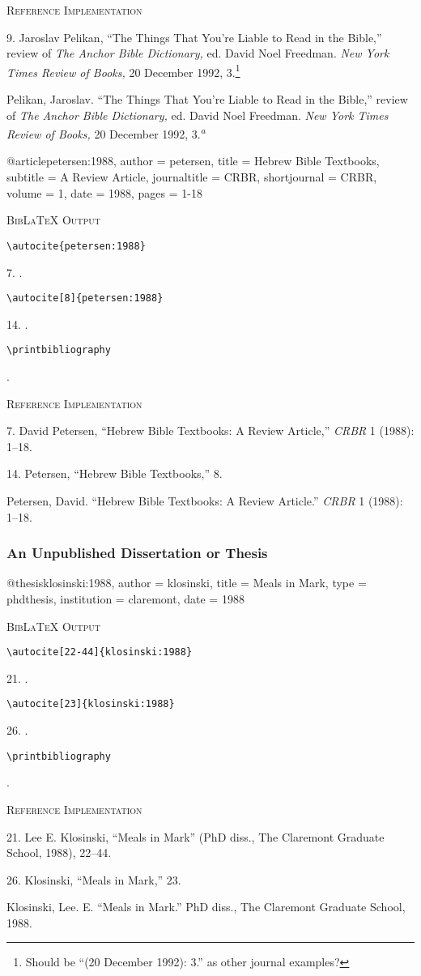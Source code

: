 \documentclass[a4paper]{article}
\newcommand\citetest[5]{%
  {\textsc{BibLaTeX Output}\par
   \nobreak
   \texttt{\textbackslash autocite[#2]\{#5\}}\par
   \color{biblatex-colour}
   #1. \cite[#2]{#5}.\par
   \color{black}
   \texttt{\textbackslash autocite[#4]\{#5\}}\par
   \color{biblatex-colour}
   #3. \cite[#4]{#5}.\par
   \color{black}
   \texttt{\textbackslash printbibliography}\par
   \color{biblatex-colour}
   \hangindent\bibindent\bibentrycite{#5}.\par}}
\newcommand\citetestnpf[4]{%
  {\textsc{BibLaTeX Output}\par
   \nobreak
   \texttt{\textbackslash autocite\{#4\}}\par
   \color{biblatex-colour}
   #1. \cite{#4}.\par
   \color{black}
   \texttt{\textbackslash autocite[#3]\{#4\}}\par
   \color{biblatex-colour}
   #2. \cite[#3]{#4}.\par
   \color{black}
   \texttt{\textbackslash printbibliography}\par
   \color{biblatex-colour}
   \hangindent\bibindent\bibentrycite{#4}.\par}}
\newenvironment{refimp}{%
  \begin{minipage}{\linewidth}
    \setlength{\parskip}{1ex}
    \textsc{Reference Implementation}\par
    \nobreak
    \color{reference-colour}
}{\end{minipage}}
\newenvironment{vb}{%
  \setlength{\parskip}{0pt}
  \verbatim}{\endverbatim}
\begin{document}
\begin{refimp}
  9. Jaroslav Pelikan, “The Things That You're Liable to Read in the Bible,”
  review of \emph{The Anchor Bible Dictionary,} ed. David Noel Freedman.
  \emph{New York Times Review of Books,} 20 December 1992, 3.\footnote{Should
  be “(20 December 1992): 3.” as other journal examples?}
  
  \hangindent\bibindent Pelikan, Jaroslav. “The Things That You're Liable to
  Read in the Bible,” review of \emph{The Anchor Bible Dictionary,} ed. David
  Noel Freedman. \emph{New York Times Review of Books,} 20 December 1992,
  3.\textsuperscript{\emph{a}}
\end{refimp}

\begin{vb}
@article{petersen:1988,
  author = petersen,
  title = {Hebrew Bible Textbooks},
  subtitle = {A Review Article},
  journaltitle = CRBR,
  shortjournal = {CRBR},
  volume = {1},
  date = {1988},
  pages = {1-18}
}
\end{vb}

\citetestnpf{7}{14}{8}{petersen:1988}

\begin{refimp}
  7. David Petersen, “Hebrew Bible Textbooks: A Review Article,” \emph{CRBR} 1
  (1988): 1–18.

  14. Petersen, “Hebrew Bible Textbooks,” 8.

  \hangindent\bibindent Petersen, David. “Hebrew Bible Textbooks: A Review
  Article.” \emph{CRBR} 1 (1988): 1–18.
\end{refimp}

\subsubsection{An Unpublished Dissertation or Thesis}

\begin{vb}
@thesis{klosinski:1988,
  author = klosinski,
  title = {Meals in Mark},
  type = {phdthesis},
  institution = claremont,
  date = {1988}
}
\end{vb}  

\citetest{21}{22-44}{26}{23}{klosinski:1988}

\begin{refimp}
  21. Lee E. Klosinski, “Meals in Mark” (PhD diss., The Claremont Graduate
  School, 1988), 22–44.

  26. Klosinski, “Meals in Mark,” 23.

  \hangindent\bibindent Klosinski, Lee. E. “Meals in Mark.” PhD diss., The
  Claremont Graduate School, 1988.
\end{refimp}
\end{document}

